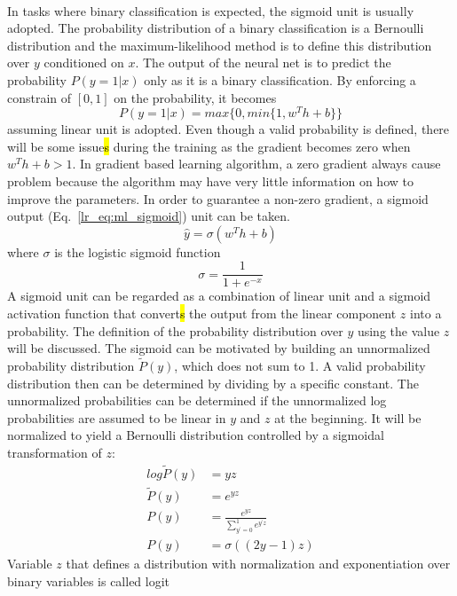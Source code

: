 \paragraph{}
In tasks where binary classification is expected, the sigmoid unit is usually adopted.
The probability distribution of a binary classification is a Bernoulli distribution and the maximum-likelihood method is to define this distribution over $y$ conditioned on $x$.
The output of the neural net is to predict the probability $P(y=1|x)$ only as it is a binary classification.
By enforcing a constrain of $[0,1]$ on the probability, it becomes
\begin{equation}
    P(y=1|x) = max\{0,min\{1, w^T h + b\}\}
\end{equation}
%
assuming linear unit is adopted.
Even though a valid probability is defined, there will be some issue\hl{s} during the training as the gradient becomes zero when $w^T h +b>1$.
In gradient based learning algorithm, a zero gradient always cause problem because the algorithm may have very little information on how to improve the parameters.
In order to guarantee a non-zero gradient, a sigmoid output (Eq.~\ref{lr_eq:ml_sigmoid}) unit can be taken.
\begin{equation}
    \hat{y} = \sigma (w^T h +b)
    \label{lr_eq:ml_sigmoid}
\end{equation}
where $\sigma$ is the logistic sigmoid function
\begin{equation}
    \sigma = \frac{1}{1+e^{-x}}
\end{equation}
%
A sigmoid unit can be regarded as a combination of linear unit and a sigmoid activation function that convert\hl{s} the output from the linear component $z$ into a probability.
The definition of the probability distribution over $y$ using the value $z$ will be discussed.
The sigmoid can be motivated by building an unnormalized probability distribution $\tilde{P}(y)$, which does not sum to 1.
A valid probability distribution then can be determined by dividing by a specific constant.
The unnormalized probabilities can be determined if the unnormalized log probabilities are assumed to be linear in $y$ and $z$ at the beginning.
It will be normalized to yield a Bernoulli distribution controlled by a sigmoidal transformation of $z$:
\begin{equation}
    \begin{aligned}
        log \tilde{P} (y) &= yz \\
        \tilde{P} (y) &= e^{yz} \\
        P(y) &= \frac{e^{yz}}{\sum_{y^\prime=0}^1 e^{y^\prime z}} \\
        P(y) &= \sigma ((2y-1)z)
    \end{aligned}
\end{equation}
%
Variable $z$ that defines a distribution with normalization and exponentiation over binary variables is called logit

